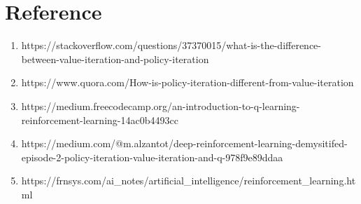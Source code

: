 \documentclass[11pt]{article}
\begin{document}
\section{Reference}
\begin{enumerate}
\item https://stackoverflow.com/questions/37370015/what-is-the-difference-between-value-iteration-and-policy-iteration
\item https://www.quora.com/How-is-policy-iteration-different-from-value-iteration
\item https://medium.freecodecamp.org/an-introduction-to-q-learning-reinforcement-learning-14ac0b4493cc
\item https://medium.com/@m.alzantot/deep-reinforcement-learning-demysitifed-episode-2-policy-iteration-value-iteration-and-q-978f9e89ddaa
\item https://frnsys.com/ai\_notes/artificial\_intelligence/reinforcement\_learning.html
\end{enumerate}
\end{document}
